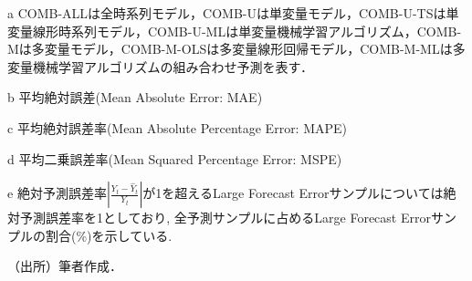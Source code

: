 \begin{threeparttable}
\begin{tablenotes}
\item[a] COMB-ALLは全時系列モデル，COMB-Uは単変量モデル，COMB-U-TSは単変量線形時系列モデル，COMB-U-MLは単変量機械学習アルゴリズム，COMB-Mは多変量モデル，COMB-M-OLSは多変量線形回帰モデル，COMB-M-MLは多変量機械学習アルゴリズムの組み合わせ予測を表す．
\item[b] 平均絶対誤差(Mean Absolute Error: MAE)
\item[c] 平均絶対誤差率(Mean Absolute Percentage Error: MAPE)
\item[d] 平均二乗誤差率(Mean Squared Percentage Error: MSPE)
\item[e] 絶対予測誤差率$\left| \frac{Y_t -{\hat Y}_t}{Y_t} \right|$が1を超えるLarge Forecast Errorサンプルについては絶対予測誤差率を1としており, 全予測サンプルに占めるLarge Forecast Errorサンプルの割合(\%)を示している.
\item[] （出所）筆者作成．
\end{tablenotes}
\end{threeparttable}  